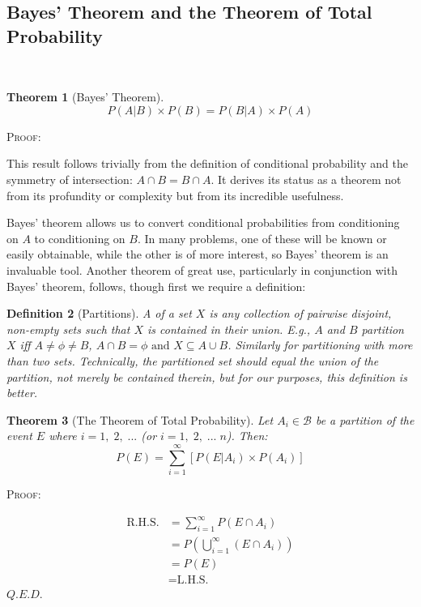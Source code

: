 \documentclass[12pt,a4paper]{article}
\newtheorem{thm}{Theorem}[subsection]
\newtheorem{defn}[thm]{Definition}
\newcommand{\uline}[1]{\underline{\smash{#1}}}
\begin{document}
\subsection{Bayes' Theorem and the Theorem of Total Probability}\label{total prob}$\;$

\begin{thm}[Bayes' Theorem]
$$P(A|B) \times P(B) = P(B|A) \times P(A)$$
\end{thm}

\noindent \textsc{Proof:}\par
\vspace{12pt}
\indent This result follows trivially from the definition of conditional probability and the symmetry of intersection: $A \cap B = B \cap A$. It derives its status as a theorem not from its profundity or complexity but from its incredible usefulness.

Bayes' theorem allows us to convert conditional probabilities from conditioning on $A$ to conditioning on $B$. In many problems, one of these will be known or easily obtainable, while the other is of more interest, so Bayes' theorem is an invaluable tool. Another theorem of great use, particularly in conjunction with Bayes' theorem, follows, though first we require a definition:

\begin{defn}[Partitions]

A \uline{partition} of a set $X$ is any collection of pairwise disjoint, non-empty sets such that $X$ is contained in their union. E.g., $A$ and $B$ partition $X$ iff $A\neq \phi \neq B$, $A \cap B = \phi \text{ and } X \subseteq A \cup B$. Similarly for partitioning with more than two sets. Technically, the partitioned set should \emph{equal} the union of the partition, not merely be contained therein, but for our purposes, this definition is better.

\end{defn}

\begin{thm}[The Theorem of Total Probability]

Let $A_i \in \mathcal{B}$ be a partition of the event $E$ where $i = 1,\;2,\;...$ (or $i = 1,\;2,\;...\;n$). Then:
$$P(E) = \sum_{i=1}^{\infty}[P(E|A_i) \times P(A_i)]$$
\end{thm}

\textsc{Proof:}\par
\vspace{12pt}
\begin{align*}
\text{R.H.S.} &= \sum_{i=1}^{\infty}P(E \cap A_i)\\
&= P\left(\bigcup_{i=1}^{\infty}(E\cap A_i)\right)\\
&= P(E)\\
&= \text{L.H.S.}
\end{align*}
\hfill $Q.E.D.$
\end{document}
